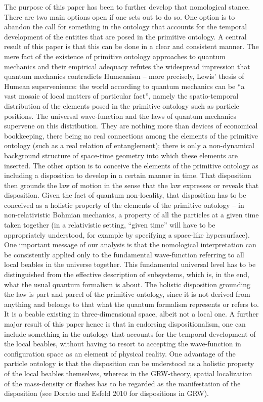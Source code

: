 \documentclass[12pt,a4paper]{article}
\theoremstyle{definition}
\begin{document}
The purpose of this paper has been to further develop that nomological stance. There are two main options open if one sets out to do so. One option is to abandon the call for something in the ontology that accounts for the temporal development of the entities that are posed in the primitive ontology. A central result of this paper is that this can be done in a clear and consistent manner. The mere fact of the existence of primitive ontology approaches to quantum mechanics and their empirical adequacy refutes the widespread impression that quantum mechanics contradicts Humeanism -- more precisely, Lewis' thesis of Humean supervenience: the world according to quantum mechanics can be ``a vast mosaic of local matters of particular fact'', namely the spatio-temporal distribution of the elements posed in the primitive ontology such as particle positions. The universal wave-function and the laws of quantum mechanics supervene on this distribution. They are nothing more than devices of economical bookkeeping, there being no real connections among the elements of the primitive ontology (such as a real relation of entanglement); there is only a non-dynamical background structure of space-time geometry into which these elements are inserted.
The other option is to conceive the elements of the primitive ontology as including a disposition to develop in a certain manner in time. That disposition then grounds the law of motion in the sense that the law expresses or reveals that disposition. Given the fact of quantum non-locality, that disposition has to be conceived as a holistic property of the elements of the primitive ontology -- in non-relativistic Bohmian mechanics, a property of all the particles at a given time taken together (in a relativistic setting, ``given time'' will have to be appropriately understood, for example by specifying a space-like hypersurface). One important message of our analysis is that the nomological interpretation can be consistently applied only to the fundamental wave-function referring to all local beables in the universe together. This fundamental universal level has to be distinguished from the effective description of subsystems, which is, in the end, what the usual quantum formalism is about.
The holistic disposition grounding the law is part and parcel of the primitive ontology, since it is not derived from anything and belongs to that what the quantum formalism represents or refers to. It is a beable existing in three-dimensional space, albeit not a local one. A further major result of this paper hence is that in endorsing dispositionalism, one can include something in the ontology that accounts for the temporal development of the local beables, without having to resort to accepting the wave-function in configuration space as an element of physical reality. One advantage of the particle ontology is that the disposition can be understood as a holistic property of the local beables themselves, whereas in the GRW-theory, spatial localization of the mass-density or flashes has to be regarded as the manifestation of the disposition (see Dorato and Esfeld 2010 for dispositions in GRW).
\end{document}
